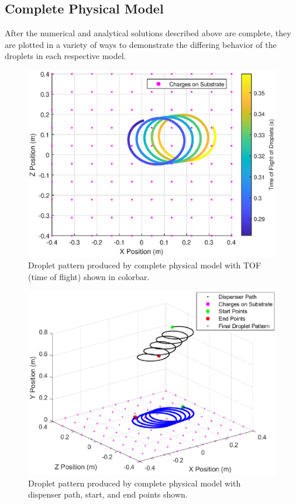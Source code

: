 \documentclass[a4paper,12pt]{report}
\begin{document}
\subsection{Complete Physical Model}
After the numerical and analytical solutions described above are complete, they are plotted in a variety of ways to demonstrate the differing behavior of the droplets in each respective model.
\begin{figure}[H]
\begin{nscenter}
  \includegraphics[width=0.75\linewidth]{part1_2.eps}
  \caption{Droplet pattern produced by complete physical model with TOF (time of flight) shown in colorbar.}
  \end{nscenter}
\end{figure}
\begin{figure}[H]
\begin{nscenter}
  \includegraphics[width=0.75\linewidth]{part1_3.eps}
  \caption{Droplet pattern produced by complete physical model with dispenser path, start, and end points shown.}
  \end{nscenter}
\end{figure}
\end{document}
